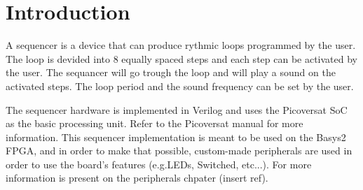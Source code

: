\section{Introduction}

\noindent
A sequencer is a device that can produce rythmic loops programmed by the user. The loop is devided into 8 equally spaced steps and each step can be activated by the user. The sequancer will go trough the loop and will play a sound on the activated steps. The loop period and the sound frequency can be set by the user.


The sequencer hardware is implemented in Verilog and uses the Picoversat SoC as the basic processing unit. Refer to the Picoversat manual for more information. 
This sequencer implementation is meant to be used on the Basys2 FPGA, and in order to make that possible, custom-made peripherals are used in order to use the board's features (e.g.LEDs, Switched, etc...). For more information is present on the peripherals chpater (insert ref).
